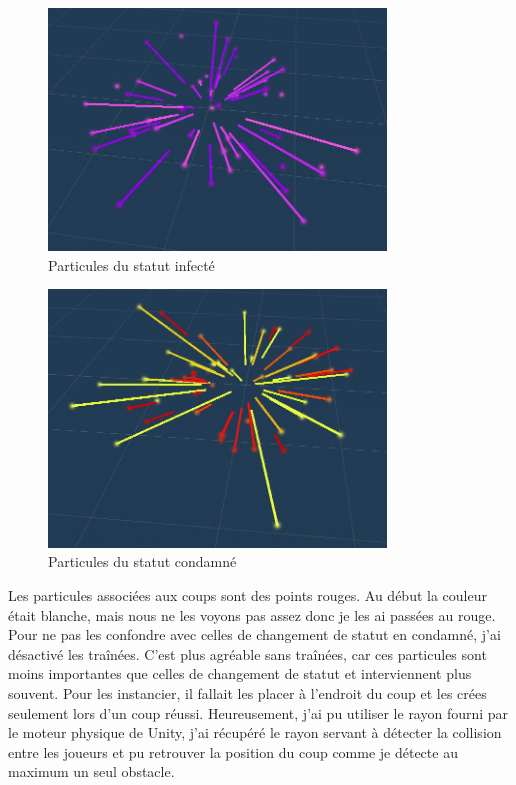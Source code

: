 \documentclass{article}
\begin{document}
\begin{figure}[H]
\centering
\includegraphics[width=0.8\textwidth]{cc/particles_infected.JPG}
\caption{Particules du statut infecté}
\label{Particules du status infécté}
\end{figure}




\begin{figure}[H]
\centering
\includegraphics[width=0.8\textwidth]{cc/particles_revenge.JPG}
\caption{Particules du statut condamné}
\label{Particules du status condamné}
\end{figure}


Les particules associées aux coups sont des points rouges. Au début la couleur était blanche, mais nous ne les voyons pas assez donc je les ai passées au rouge. Pour ne pas les confondre avec celles de changement de statut en condamné, j'ai désactivé les traînées. C'est plus agréable sans traînées, car ces particules sont moins importantes que celles de changement de statut et interviennent plus souvent. Pour les instancier, il fallait les placer à l'endroit du coup et les crées seulement lors d'un coup réussi. Heureusement, j'ai pu utiliser le rayon fourni par le moteur physique de Unity, j'ai récupéré le rayon servant à détecter la collision entre les joueurs et pu retrouver la position du coup comme je détecte au maximum un seul obstacle.
\end{document}

